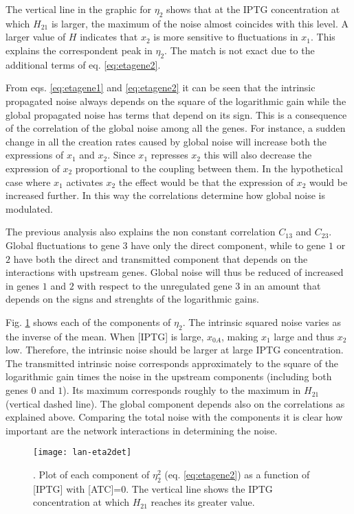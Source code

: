 The vertical line in the graphic for $\eta_2$ shows that at the IPTG concentration at which $H_{21}$ is larger, the maximum of the noise almost coincides with this level. A larger value of $H$ indicates that $x_2$ is more sensitive to fluctuations in $x_1$. This explains the correspondent peak in $\eta_2$. The match is not exact due to the additional terms of eq. \eqref{eq:etagene2}. 

From eqs. \eqref{eq:etagene1} and \eqref{eq:etagene2} it can be seen that the intrinsic propagated noise always depends on the square of the logarithmic gain while the global propagated noise has terms that depend on its sign. This is a consequence of the correlation of the global noise among all the genes. For instance, a sudden change in all the creation rates caused by global noise will increase both the expressions of $x_1$ and $x_2$. Since $x_1$ represses $x_2$ this will also decrease the expression of $x_2$ proportional to the coupling between them. In the hypothetical case where $x_1$ activates $x_2$ the effect would be that the expression of $x_2$ would be increased further. In this way the correlations determine how global noise is modulated.

The previous analysis also explains the non constant correlation $C_{13}$ and $C_{23}$. Global fluctuations to gene $3$ have only the direct component, while to gene $1$ or $2$ have both the direct and transmitted component that depends on the interactions with upstream genes. Global noise will thus be reduced of increased in genes $1$ and $2$ with respect to the unregulated gene $3$ in an amount that depends on the signs and strenghts of the logarithmic gains.

Fig. \ref{fig:lan-eta2det} shows each of the components of $\eta_2$. The intrinsic squared noise varies as the inverse of the mean. When [IPTG] is large, $x_{0A}$, making $x_1$ large and thus $x_2$ low. Therefore, the intrinsic noise should be larger at large IPTG concentration. The transmitted intrinsic noise corresponds approximately to the square of the logarithmic gain times the noise in the upstream components (including both genes $0$ and $1$). Its maximum corresponds roughly to the maximum in $H_{21}$ (vertical dashed line). The global component depends also on the correlations as explained above. Comparing the total noise with the components it is clear how important are the network interactions in determining the noise.

\begin{figure}[H]
  \centering
  \texttt{[image: lan-eta2det]}
  \caption[Components of the noise]{\label{fig:lan-eta2det}. Plot of each component of $\eta_2^2$ (eq. \eqref{eq:etagene2}) as a function of [IPTG] with [ATC]=0. The vertical line shows the IPTG concentration at which $H_{21}$ reaches its greater value.}
\end{figure}

